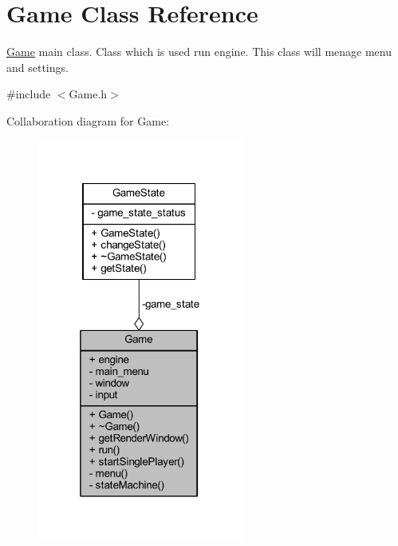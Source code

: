 \hypertarget{class_game}{}\section{Game Class Reference}
\label{class_game}


\hyperlink{class_game}{Game} main class. Class which is used run engine. This class will menage menu and settings.  




{\ttfamily \#include $<$Game.\+h$>$}



Collaboration diagram for Game\+:
\nopagebreak
\begin{figure}[H]
\begin{center}
\leavevmode
\includegraphics[width=193pt]{class_game__coll__graph}
\end{center}
\end{figure}
